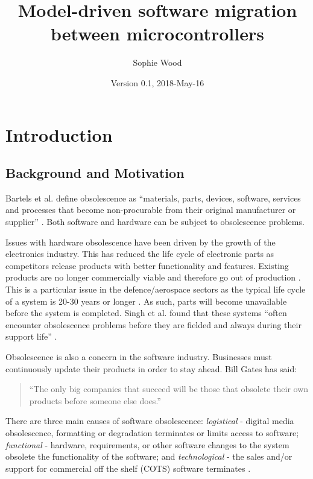\documentclass{UoYCSproject}
\author{Sophie Wood}
\title{Model-driven software migration between microcontrollers}
\date{Version 0.1, 2018-May-16}
\begin{document}
\maketitle
\listoffigures
\listoftables

\chapter{Introduction}
\section{Background and Motivation}

Bartels et al. define obsolescence as ``materials, parts, devices, software, services and processes that become non-procurable from their original manufacturer or supplier'' \parencite{bartels2012strategies}. Both software and hardware can be subject to obsolescence problems. 

Issues with hardware obsolescence have been driven by the growth of the electronics industry. This has reduced the life cycle of electronic parts as competitors release products with better functionality and features. Existing products are no longer commercially viable and therefore go out of production \parencite{bartels2012strategies}. This is a particular issue in the defence/aerospace sectors as the typical life cycle of a system is 20-30 years or longer \parencite{rojo2010obsolescence}. As such, parts will become unavailable before the system is completed. Singh et al. found that these systems ``often encounter obsolescence problems before they are fielded and always during their support life'' \parencite{singh2006obsolescence}.

Obsolescence is also a concern in the software industry. Businesses must continuously update their products in order to stay ahead. Bill Gates has said: 
\begin{quote}
``The only big companies that succeed will be those that obsolete their own products before someone else does.'' \parencite{bartels2012strategies}
\end{quote}
There are three main causes of software obsolescence: \textit{logistical} -  digital media obsolescence, formatting or degradation terminates or limits access to software; \textit{functional} - hardware, requirements, or other software changes to the system obsolete the functionality of the software; and \textit{technological} - the sales and/or support for commercial off the shelf (COTS) software terminates \parencite{sandborn2007obsolescence}. 
\end{document}
